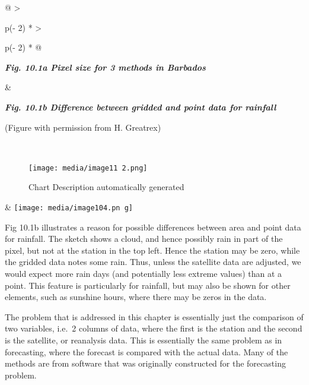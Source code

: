 \documentclass[
  letterpaper,
  DIV=11,
  numbers=noendperiod]{scrreprt}
\begin{document}
\begin{longtable}[]{@{}
  >{\raggedright\arraybackslash}p{(\columnwidth - 2\tabcolsep) * }
  >{\raggedright\arraybackslash}p{(\columnwidth - 2\tabcolsep) * }@{}}
\toprule\noalign{}
\begin{minipage}[b]{\linewidth}\raggedright
\textbf{\emph{Fig. 10.1a Pixel size for 3 methods in Barbados}}
\end{minipage} & \begin{minipage}[b]{\linewidth}\raggedright
\textbf{\emph{Fig. 10.1b Difference between gridded and point data for
rainfall}}

(Figure with permission from H. Greatrex)
\end{minipage} \\
\midrule\noalign{}
\endhead
\bottomrule\noalign{}
\endlastfoot
\begin{minipage}[t]{\linewidth}\raggedright
\begin{figure}[H]

{\centering \texttt{[image: media/image11 2.png]}

}

\caption{Chart Description automatically generated}

\end{figure}%
\end{minipage} &
\texttt{[image: media/image104.pn g]} \\
\end{longtable}

Fig 10.1b illustrates a reason for possible differences between area and
point data for rainfall. The sketch shows a cloud, and hence possibly
rain in part of the pixel, but not at the station in the top left. Hence
the station may be zero, while the gridded data notes some rain. Thus,
unless the satellite data are adjusted, we would expect more rain days
(and potentially less extreme values) than at a point. This feature is
particularly for rainfall, but may also be shown for other elements,
such as sunshine hours, where there may be zeros in the data.

The problem that is addressed in this chapter is essentially just the
comparison of two variables, i.e.~2 columns of data, where the first is
the station and the second is the satellite, or reanalysis data. This is
essentially the same problem as in forecasting, where the forecast is
compared with the actual data. Many of the methods are from software
that was originally constructed for the forecasting problem.
\end{document}

